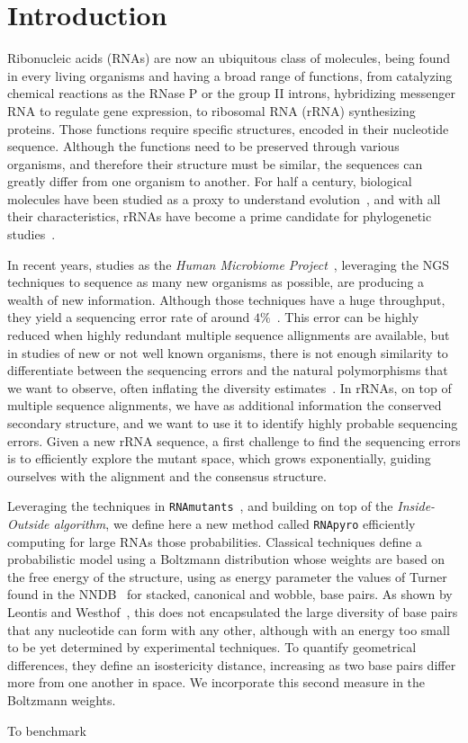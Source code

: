 \section{Introduction}
\label{sec:introduction}

Ribonucleic acids (RNAs) are  now  an ubiquitous class of molecules, being
found in every living organisms and having a broad range of functions, from catalyzing
chemical reactions as the RNase P or the group II introns,
hybridizing  messenger RNA to regulate gene expression,
to ribosomal RNA (rRNA) synthesizing proteins.
Those functions  require specific structures, 
encoded in their nucleotide sequence. Although the functions
need to be preserved through various organisms, and therefore
their structure must be similar,  the sequences
can greatly differ from one organism to another.
For half a century, biological molecules have been studied as a proxy to understand
evolution~\cite{Zuckerkandl1965}, and with all their characteristics, rRNAs have
become a prime candidate for phylogenetic studies~\cite{Olsen1986, Olsen1993}.

In recent years, studies as the \emph{Human Microbiome Project}~\cite{Turnbaugh2007}, 
leveraging the NGS techniques to sequence as many new organisms 
as possible, are producing a wealth of new information. Although
those techniques have a huge throughput, they yield a sequencing error rate of around
$4\%$~\cite{Huse2007}. This error can be highly reduced  when highly 
redundant multiple sequence allignments 
 are available, but in studies of new or not well known organisms, there is not
 enough  similarity to differentiate between the sequencing errors and the natural 
 polymorphisms that we want to observe, often inflating the diversity estimates~\cite{Kunin2010}.
  In rRNAs, on top of multiple sequence alignments, we have as additional 
 information the conserved secondary structure, and we want to use it to identify
highly probable sequencing errors. 
Given a new rRNA sequence, a first challenge to find the sequencing errors
  is to  efficiently explore the mutant space, 
which grows exponentially, guiding ourselves with the alignment and the consensus structure.

Leveraging the techniques  in \texttt{RNAmutants}~\cite{Waldispuhl2008}, and building on top 
of the \emph{Inside-Outside algorithm}, we define here a new method called \texttt{RNApyro}
efficiently computing for large RNAs those probabilities.
 Classical techniques define a probabilistic model using a Boltzmann distribution 
whose weights are based on the free energy of the structure, using as energy parameter
the values of Turner found in the NNDB~\cite{Turner2010}  for stacked, 
canonical and wobble, base pairs. As shown by Leontis and Westhof~\cite{Leontis2001},
this  does not encapsulated the large diversity of base pairs that any nucleotide
can form with any other, although with an energy too small to be yet determined
by experimental techniques. To quantify geometrical differences, they
 define an isostericity distance, increasing as two base pairs differ 
 more from one another in space. We incorporate this second measure in the Boltzmann weights.
 
To benchmark 